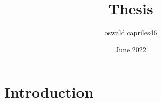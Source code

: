 \documentclass{article}
\title{Thesis}
\author{oswald.capriles46 }
\date{June 2022}
\begin{document}
\maketitle

\section{Introduction}
\end{document}

